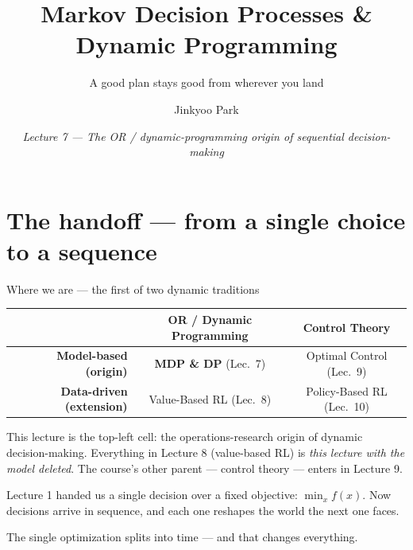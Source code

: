 \documentclass[10pt, aspectratio=169]{beamer}
\title{Markov Decision Processes \& Dynamic Programming}
\subtitle{A good plan stays good from wherever you land}
\author{Jinkyoo Park}
\institute{KAIST}
\date{\textit{Lecture 7 --- The OR / dynamic-programming origin of sequential decision-making}}
\begin{document}

\maketitle

\section{The handoff --- from a single choice to a sequence}

\begin{frame}{Where we are --- the first of two dynamic traditions}
\vspace{2pt}
\begin{center}\footnotesize
\renewcommand{\arraystretch}{1.35}
\begin{tabular}{r|c|c}
 & \textbf{OR / Dynamic Programming} & \textbf{Control Theory} \\
\hline
\textbf{Model-based (origin)}  & \cellcolor{mDarkTeal!20}\textbf{MDP \& DP} \scriptsize(\alert{Lec.\ 7}) & Optimal Control \scriptsize(Lec.\ 9)\\
\hline
\textbf{Data-driven (extension)} & Value-Based RL \scriptsize(Lec.\ 8) & Policy-Based RL \scriptsize(Lec.\ 10)\\
\end{tabular}
\end{center}
\smallskip

This lecture is the \alert{top-left cell}: the operations-research origin of dynamic decision-making. Everything in Lecture 8 (value-based RL) is \emph{this lecture with the model deleted}. The course's other parent --- control theory --- enters in Lecture 9.
\smallskip

\pause
Lecture 1 handed us a single decision over a fixed objective: $\min_x f(x)$. Now decisions arrive \alert{in sequence}, and each one \alert{reshapes the world the next one faces}.
\medskip

\pause
\begin{center}\large
The single optimization splits into time --- and that changes everything.
\end{center}
\end{frame}
\end{document}
